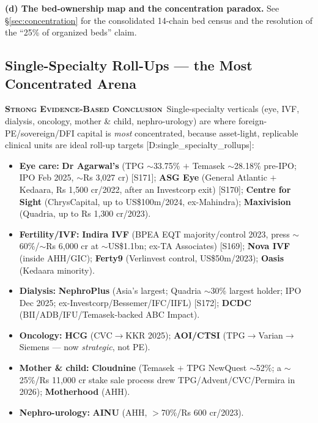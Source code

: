 \documentclass[11pt,a4paper]{article}
\newcommand{\SE}{\textcolor{secol}{\textsc{\textbf{Strong Evidence-Based Conclusion}}}}
\newcommand{\cs}[1]{\textnormal{[#1]}}
\begin{document}
\textbf{(d) The bed-ownership map and the concentration paradox.} See \S\ref{sec:concentration} for the consolidated 14-chain bed census and the resolution of the ``25\% of organized beds'' claim.

\subsection{Single-Specialty Roll-Ups --- the Most Concentrated Arena}\label{sec:singlespecialty}

\SE\ Single-specialty verticals (eye, IVF, dialysis, oncology, mother \& child, nephro-urology) are where foreign-PE/sovereign/DFI capital is \emph{most} concentrated, because asset-light, replicable clinical units are ideal roll-up targets \cs{D:single\_specialty\_rollups}:

\begin{itemize}[leftmargin=1.4em,itemsep=2pt]
\item \textbf{Eye care:} \textbf{Dr Agarwal's} (TPG $\sim$33.75\% $+$ Temasek $\sim$28.18\% pre-IPO; IPO Feb 2025, $\sim$Rs 3{,}027 cr) \cs{S171}; \textbf{ASG Eye} (General Atlantic $+$ Kedaara, Rs 1{,}500 cr/2022, after an Investcorp exit) \cs{S170}; \textbf{Centre for Sight} (ChrysCapital, up to US\$100m/2024, ex-Mahindra); \textbf{Maxivision} (Quadria, up to Rs 1{,}300 cr/2023).
\item \textbf{Fertility/IVF:} \textbf{Indira IVF} (BPEA EQT majority/control 2023, press $\sim$60\%/$\sim$Rs 6{,}000 cr at $\sim$US\$1.1bn; ex-TA Associates) \cs{S169}; \textbf{Nova IVF} (inside AHH/GIC); \textbf{Ferty9} (Verlinvest control, US\$50m/2023); \textbf{Oasis} (Kedaara minority).
\item \textbf{Dialysis:} \textbf{NephroPlus} (Asia's largest; Quadria $\sim$30\% largest holder; IPO Dec 2025; ex-Investcorp/Bessemer/IFC/IIFL) \cs{S172}; \textbf{DCDC} (BII/ADB/IFU/Temasek-backed ABC Impact).
\item \textbf{Oncology:} \textbf{HCG} (CVC$\rightarrow$KKR 2025); \textbf{AOI/CTSI} (TPG$\rightarrow$Varian$\rightarrow$Siemens --- now \emph{strategic}, not PE).
\item \textbf{Mother \& child:} \textbf{Cloudnine} (Temasek $+$ TPG NewQuest $\sim$52\%; a $\sim$25\%/Rs 11{,}000 cr stake sale process drew TPG/Advent/CVC/Permira in 2026); \textbf{Motherhood} (AHH).
\item \textbf{Nephro-urology:} \textbf{AINU} (AHH, $>$70\%/Rs 600 cr/2023).
\end{itemize}
\end{document}
